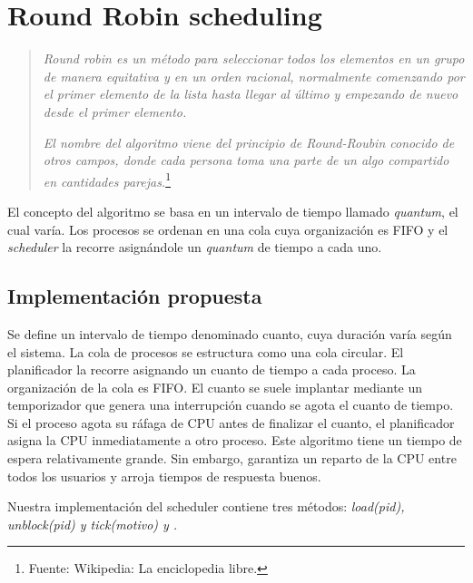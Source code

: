 \section{Round Robin scheduling}

\begin{quote}
	\textit{Round robin es un método para seleccionar todos los elementos en un grupo de manera equitativa y en un orden racional, normalmente comenzando por el primer elemento de la lista hasta llegar al último y empezando de nuevo desde el primer elemento.} 
	
	\textit{El nombre del algoritmo viene del principio de Round-Roubin conocido de otros campos, donde cada persona toma una parte de un algo compartido en cantidades parejas.}\footnote{Fuente: Wikipedia: La enciclopedia libre.}
	
\end{quote}

	El concepto del algoritmo se basa en un intervalo de tiempo llamado \textit{quantum}, el cual varía. Los procesos se ordenan en una cola cuya organización es FIFO y el \textit{scheduler} la recorre asignándole un \textit{quantum} de tiempo a cada uno.

\subsection{Implementación propuesta}

Se define un intervalo de tiempo denominado cuanto, cuya duración varía según el sistema. La cola de procesos se estructura como una cola circular. El planiﬁcador la recorre asignando un cuanto de tiempo a cada proceso. La organización de la cola es FIFO. El cuanto se suele implantar mediante un temporizador que genera una interrupción cuando se agota el cuanto de tiempo. Si el proceso agota su ráfaga de CPU antes de ﬁnalizar el cuanto, el planiﬁcador asigna la CPU inmediatamente a otro proceso. Este algoritmo tiene un tiempo de espera relativamente grande. Sin embargo, garantiza un reparto de la CPU entre todos los usuarios y arroja tiempos de respuesta buenos.

Nuestra implementación del scheduler contiene tres métodos: \textit{load(pid), unblock(pid) y tick(motivo) y .}